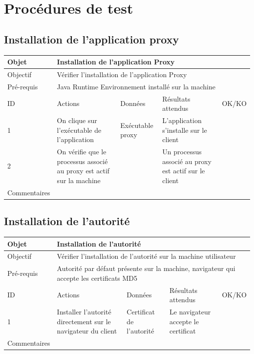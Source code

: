 \documentclass[a4paper,11pt,french]{article}
\begin{document}
\section{Procédures de test}
\subsection{Installation de l'application proxy}

\begin{tabular}{|m{2.5cm}|m{4cm}|m{3cm}|m{3.5cm}|m{2cm}|}
\hline 
\rowcolor{Blue} Objet & \multicolumn{4}{|l|}{Installation de l'application Proxy} \\ 
\hline 
\rowcolor{Blue} Objectif & \multicolumn{4}{|l|}{Vérifier l'installation de l'application Proxy} \\ 
\hline 
\rowcolor{Blue} Pré-requis & \multicolumn{4}{|l|}{Java Runtime Environnement installé sur la machine} \\ 
\hline 
\rowcolor{Orange} ID & Actions & Données & Résultats attendus & OK/KO \\ 
\hline 
1 & On clique sur l'exécutable de l'application & Exécutable proxy & L'application s'installe sur le client &  \\ 
\hline
2 & On vérifie que le processus associé au proxy est actif sur la machine & & Un processus associé au proxy est actif sur le client & \\
\hline
Commentaires & \multicolumn{4}{|l|}{} \\ 
\hline
\end{tabular}

\newpage

\subsection{Installation de l'autorité}

\begin{tabular}{|m{2.5cm}|m{4cm}|m{3cm}|m{3.5cm}|m{2cm}|}
\hline 
\rowcolor{Blue} Objet & \multicolumn{4}{|l|}{Installation de l'autorité} \\ 
\hline 
\rowcolor{Blue} Objectif & \multicolumn{4}{|l|}{Vérifier l'installation de l'autorité sur la machine utilisateur} \\ 
\hline 
\rowcolor{Blue} Pré-requis & \multicolumn{4}{|l|}{Autorité par défaut présente sur la machine, navigateur qui accepte les certificats MD5} \\ 
\hline 
\rowcolor{Orange} ID & Actions & Données & Résultats attendus & OK/KO \\ 
\hline 
1 & Installer l'autorité directement sur le navigateur du client & Certificat de l'autorité & Le navigateur accepte le certificat &  \\ 
\hline 
Commentaires & \multicolumn{4}{|l|}{} \\ 
\hline
\end{tabular}
\end{document}
